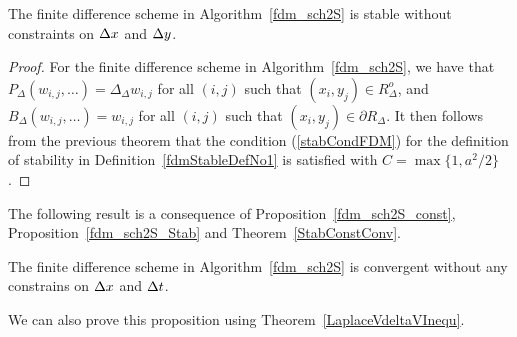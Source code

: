 \begin{prop} \label{fdm_sch2S_Stab}
The finite difference scheme in Algorithm~\ref{fdm_sch2S} is stable
without constraints on $\Delta{x}$ and $\Delta{y}$.
\end{prop}

\begin{proof}
For the finite difference scheme in Algorithm~\ref{fdm_sch2S}, we
have that
$P_\Delta(w_{i,j}, \ldots) = \Delta_\Delta w_{i,j}$ for all $(i,j)$ such
that $(x_i,y_j) \in R^o_\Delta$,  and 
$B_\Delta(w_{i,j}, \ldots) = w_{i,j}$ for all $(i,j)$ such
that $(x_i,y_j) \in \partial R_\Delta$.  It then follows from the
previous theorem that the condition (\ref{stabCondFDM}) for the
definition of stability in Definition~\ref{fdmStableDefNo1} is satisfied
with $C = \max \{ 1, a^2/2\}$.
\end{proof}

The following result is a consequence of Proposition~\ref{fdm_sch2S_const},
Proposition~\ref{fdm_sch2S_Stab} and Theorem~\ref{StabConstConv}.

\begin{prop}
The finite difference scheme in Algorithm~\ref{fdm_sch2S} is
convergent without any constrains on $\Delta{x}$ and $\Delta{t}$.
\end{prop}

We can also prove this proposition using Theorem~\ref{LaplaceVdeltaVInequ}.

